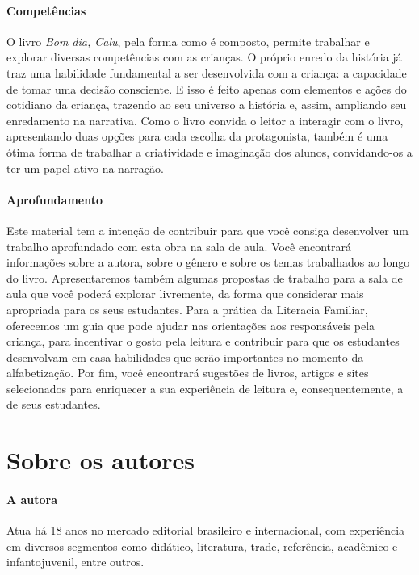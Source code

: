 \documentclass[11pt]{extarticle}
\begin{document}
\paragraph{Competências}
O livro \textit{Bom dia, Calu}, pela forma como é composto, permite trabalhar e explorar diversas competências com as crianças. O próprio enredo da história já traz uma habilidade fundamental a ser desenvolvida com a criança: a capacidade de tomar uma decisão consciente. E isso é feito apenas com elementos e ações do cotidiano da criança, trazendo ao seu universo a história e, assim, ampliando seu enredamento na narrativa. Como o livro convida o leitor a interagir com o livro, apresentando duas opções para cada escolha da protagonista, também é uma ótima forma de trabalhar a criatividade e imaginação dos alunos, convidando-os a ter um papel ativo na narração.


\paragraph{Aprofundamento} Este material tem a 
intenção de contribuir para que você consiga desenvolver um trabalho aprofundado 
com esta obra na sala de aula. Você encontrará informações sobre a autora, sobre 
o gênero e sobre os temas trabalhados ao longo do livro. Apresentaremos também 
algumas propostas de trabalho para a sala de aula que você poderá explorar livremente, 
da forma que considerar mais apropriada para os seus estudantes. Para a prática 
da Literacia Familiar, oferecemos um guia que pode ajudar nas orientações aos 
responsáveis pela criança, para incentivar o gosto pela leitura e contribuir para 
que os estudantes desenvolvam em casa habilidades que serão importantes no momento 
da alfabetização. Por fim, você encontrará sugestões de livros, artigos e sites 
selecionados para enriquecer a sua experiência de leitura e, 
consequentemente, a de seus estudantes.



\section{Sobre os autores}


\paragraph{A autora}
Atua há 18 anos no 
mercado editorial brasileiro e internacional, com experiência 
em diversos segmentos como didático, literatura, trade, 
referência, acadêmico e infantojuvenil, entre outros. 
\end{document}

